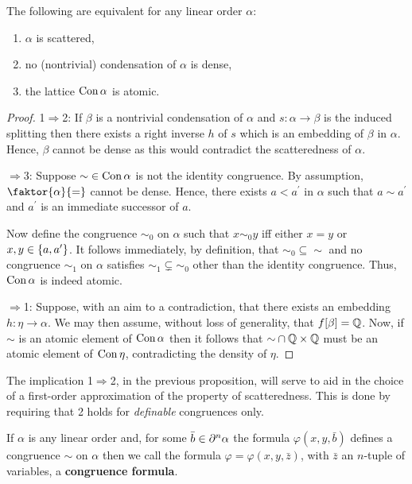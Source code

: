 \begin{prp}
	\label{prp:cscat}
	The following are equivalent for any linear order $\alpha$:
	\begin{enumerate}
		\item  $\alpha$ is scattered,
		\item  no (nontrivial) condensation of $\alpha$ is dense,
		\item  the lattice $\con\alpha$ is atomic.
	\end{enumerate}
\end{prp}
\begin{proof}
	1$\Rightarrow$2:  If $\beta$ is a nontrivial condensation of $\alpha$ and
	$s\colon\alpha\to\beta$ is the induced splitting then there exists a right
	inverse $h$ of $s$ which is an embedding of $\beta$ in $\alpha$.  Hence,
	$\beta$ cannot be dense as this would contradict the scatteredness of
	$\alpha$.

	\smallskip{}$\Rightarrow$3:  Suppose ${\sim}\in\con\alpha$ is not
	the identity congruence.  By assumption, $\faktor{\alpha}{=}$ cannot be
	dense.  Hence, there exists $a<a^\prime$ in $\alpha$ such that $a\sim
	a^\prime$ and $a^\prime$ is an immediate successor of $a$.

	Now define the congruence $\sim_0$ on $\alpha$ such that $x\sim_0 y$ iff
	either $x=y$ or $x,y\in\set{a,a^\prime}$.  It follows immediately, by
	definition, that ${\sim_0}\subseteq{\sim}$ and no congruence $\sim_1$ on
	$\alpha$ satisfies ${\sim_1}\subsetneq{\sim_0}$ other than the identity
	congruence.  Thus, $\con\alpha$ is indeed atomic.

	\smallskip{}$\Rightarrow$1:  Suppose, with an aim to a
	contradiction, that there exists an embedding $h\colon\eta\to\alpha$.  We
	may then assume, without loss of generality, that $f[\beta]=\rats$.  Now, if
	$\sim$ is an atomic element of $\con\alpha$ then it follows that
	${\sim}\cap\rats\times\rats$ must be an atomic element of $\con\eta$,
	contradicting the density of $\eta$.
\end{proof}

The implication 1$\Rightarrow$2, in the previous proposition, will serve to aid
in the choice of a first-order approximation of the property of scatteredness.
This is done by requiring that 2 holds for \textit{definable} congruences only.

\begin{dfn}
	If $\alpha$ is any linear order and, for some $\bar{b}\in\domain[n]{\alpha}$
	the formula $\varphi(x,y,\bar{b})$ defines a congruence $\sim$ on $\alpha$
	then we call the formula $\varphi=\varphi(x,y,\bar{z})$, with $\bar{z}$ an
	$n$-tuple of variables, a \textbf{congruence formula}.
\end{dfn}

